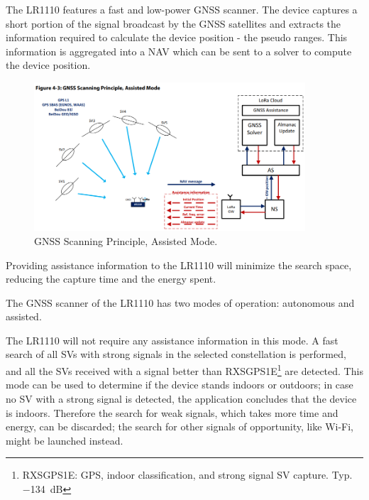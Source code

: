 The LR1110 features a fast and low-power \ac{GNSS} scanner. The device captures a short portion of the signal broadcast by the
\ac{GNSS} satellites and extracts the information required to calculate the device position - the pseudo ranges. This information is aggregated into a \ac{NAV} which can be sent to a solver to compute the device position.

\begin{figure}[H]
    \centering
    \includegraphics[width=0.9\textwidth]{figures/GNSS_scanning.png}
    \caption{GNSS Scanning Principle, Assisted Mode.}
    \label{fig:gnss_scanning}
\end{figure}

Providing assistance information to the LR1110 will minimize the search space, reducing the capture time and the energy spent.

The \ac{GNSS} scanner of the LR1110 has two modes of operation: autonomous and assisted.

The LR1110 will not require any assistance information in this mode. A fast search of all \ac{SV}s with strong signals in the
selected constellation is performed, and all the \ac{SV}s received with a signal better than RXSGPS1E\footnote{RXSGPS1E: GPS, indoor classification, and strong signal SV capture. Typ. \SI{-134}{\dB}\cite{LR1110_datasheet}} are detected.
This mode can be used to determine if the device stands indoors or outdoors; in case no \ac{SV} with a strong signal is detected, the application concludes that the device is indoors. Therefore the search for weak signals, which takes more time and energy, can be discarded; the search for other signals of opportunity, like Wi-Fi, might be launched instead.

